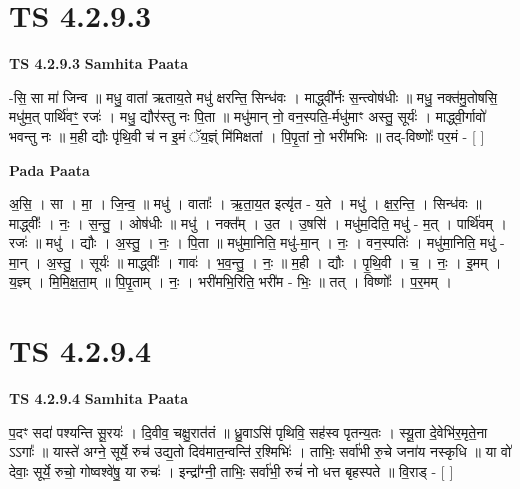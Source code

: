\documentclass[17pt]{extarticle}
\begin{document}
\section*{ TS 4.2.9.3 }

\textbf{TS 4.2.9.3 } \newline
\textbf{Samhita Paata} \newline

-सि॒ सा मा॑ जिन्व ॥ मधु॒ वाता॑ ऋताय॒ते मधु॑ क्षरन्ति॒ सिन्ध॑वः । माद्ध्वी᳚र्नः स॒न्त्वोष॑धीः ॥ मधु॒ नक्त॑मु॒तोषसि॒ मधु॑म॒त् पार्थि॑वꣳ॒॒ रजः॑ । मधु॒ द्यौर॑स्तु नः पि॒ता ॥ मधु॑मान् नो॒ वन॒स्पति॒-र्मधु॑माꣳ अस्तु॒ सूर्यः॑ । माद्ध्वी॒र्गावो॑ भवन्तु नः ॥ म॒ही द्यौः पृ॑थि॒वी च॑ न इ॒मं ॅय॒ज्ञ्ं मि॑मिक्षतां । पि॒पृ॒तां नो॒ भरी॑मभिः ॥ तद्-विष्णोः᳚ पर॒मं - [  ] \newline

\textbf{Pada Paata} \newline

अ॒सि॒ । सा । मा॒ । जि॒न्व॒ ॥ मधु॑ । वाताः᳚ । ऋ॒ता॒य॒त इत्यृ॑त - य॒ते । मधु॑ । क्ष॒र॒न्ति॒ । सिन्ध॑वः ॥ माद्ध्वीः᳚ । नः॒ । स॒न्तु॒ । ओष॑धीः ॥ मधु॑ । नक्त᳚म् । उ॒त । उ॒षसि॑ । मधु॑म॒दिति॒ मधु॑ - म॒त् । पार्थि॑वम् । रजः॑ ॥ मधु॑ । द्यौः । अ॒स्तु॒ । नः॒ । पि॒ता ॥ मधु॑मा॒निति॒ मधु॑-मा॒न् । नः॒ । वन॒स्पतिः॑ । मधु॑मा॒निति॒ मधु॑ - मा॒न् । अ॒स्तु॒ । सूर्यः॑ ॥ माद्ध्वीः᳚ । गावः॑ । भ॒व॒न्तु॒ । नः॒ ॥ म॒ही । द्यौः । पृ॒थि॒वी । च॒ । नः॒ । इ॒मम् । य॒ज्ञ्म् । मि॒मि॒क्ष॒ता॒म् ॥ पि॒पृ॒ताम् । नः॒ । भरी॑मभि॒रिति॒ भरी॑म - भिः॒ ॥ तत् । विष्णोः᳚ । प॒र॒मम् ।  \newline




\section*{ TS 4.2.9.4 }

\textbf{TS 4.2.9.4 } \newline
\textbf{Samhita Paata} \newline

प॒दꣳ सदा॑ पश्यन्ति सू॒रयः॑ । दि॒वीव॒ चक्षु॒रात॑तं ॥ ध्रु॒वाऽसि॑ पृथिवि॒ सह॑स्व पृतन्य॒तः । स्यू॒ता दे॒वेभि॑र॒मृते॒ना ऽऽगाः᳚ ॥ यास्ते॑ अग्ने॒ सूर्ये॒ रुच॑ उद्य॒तो दिव॑मात॒न्वन्ति॑ र॒श्मिभिः॑ । ताभिः॒ सर्वा॑भी रु॒चे जना॑य नस्कृधि ॥ या वो॑ देवाः॒ सूर्ये॒ रुचो॒ गोष्वश्वे॑षु॒ या रुचः॑ । इन्द्रा᳚ग्नी॒ ताभिः॒ सर्वा॑भी॒ रुचं॑ नो धत्त बृहस्पते ॥ वि॒राड् - [  ] \newline
\end{document}
